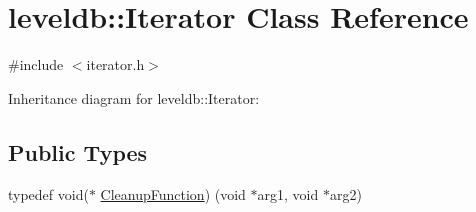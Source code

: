 \hypertarget{classleveldb_1_1_iterator}{}\section{leveldb\+:\+:Iterator Class Reference}
\label{classleveldb_1_1_iterator}


{\ttfamily \#include $<$iterator.\+h$>$}



Inheritance diagram for leveldb\+:\+:Iterator\+:
\subsection*{Public Types}
\begin{DoxyCompactItemize}
\item 
typedef void($\ast$ \hyperlink{classleveldb_1_1_iterator_ae40c9eedd82a722d24fde1fd8bee4afa}{Cleanup\+Function}) (void $\ast$arg1, void $\ast$arg2)
\end{DoxyCompactItemize}
